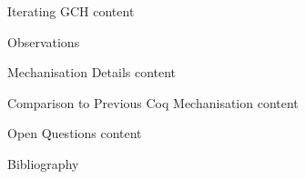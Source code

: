 \documentclass[xcolor=dvipsnames,compress,aspectratio=169,handout]{beamer}
\begin{document}
\begin{frame}{Iterating GCH}
	content
\end{frame}

\begin{frame}
	\Huge
	\centering
	Observations
\end{frame}

\begin{frame}{Mechanisation Details}
	content
\end{frame}

\begin{frame}{Comparison to Previous Coq Mechanisation}
	content
\end{frame}

\begin{frame}{Open Questions}
	content
\end{frame}



\begin{frame}{Bibliography}
\small


\end{frame}
\end{document}
